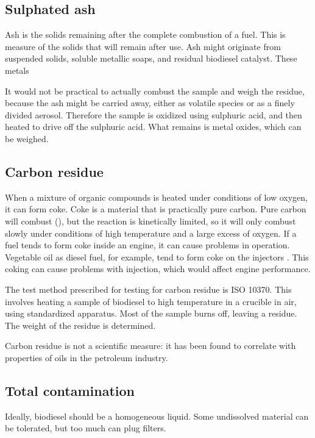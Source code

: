 \subsection{Sulphated ash}

Ash is the solids remaining after the complete combustion of a fuel. This is
measure of the solids that will remain after use. Ash might originate from
suspended solids, soluble metallic soaps, and residual biodiesel catalyst. These
metals

It would not be practical to actually combust the sample and weigh the residue,
because the ash might be carried away, either as volatile species or as a finely
divided aerosol. Therefore the sample is oxidized using sulphuric acid, and then
heated to drive off the sulphuric acid. What remains is metal oxides, which can
be weighed.

\subsection{Carbon residue}

When a mixture of organic compounds is heated under conditions of low oxygen, it
can form coke. Coke is a material that is practically pure carbon. Pure carbon
will combust (), but the reaction is kinetically limited, so it
will only combust slowly under conditions of high temperature and a large excess
of oxygen. If a fuel tends to form coke inside an engine, it can cause problems
in operation. Vegetable oil as diesel fuel, for example, tend to form coke on
the injectors \autocite{Walt1982}. This coking can cause problems with
injection, which would affect engine performance.

The test method prescribed for testing for carbon residue is ISO 10370. This
involves heating a sample of biodiesel to high temperature in a crucible in air,
using standardized apparatus. Most of the sample burns off, leaving a residue.
The weight of the residue is determined.

Carbon residue is not a scientific measure: it has been found to correlate with
properties of oils in the petroleum industry.

\subsection{Total contamination}

Ideally, biodiesel should be a homogeneous liquid. Some undissolved material can
be tolerated, but too much can plug filters.

